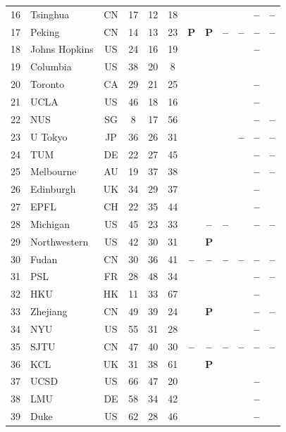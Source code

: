 \documentclass[pdflatex,sn-basic,Numbered]{sn-jnl}
\newcommand{\si}{\ding{51}}
\newcommand{\no}{\textcolor{gris}{\textbf{--}}}
\newcommand{\pc}{\textbf{P}}
\theoremstyle{thmstyleone}
\theoremstyle{thmstyletwo}
\theoremstyle{thmstylethree}
\begin{document}
\begin{appendices}
\begin{longtable}{@{}r l c c c c c c c c c c@{}}
	16 & Tsinghua & CN & 17 & 12 & 18 & \si & \si & \si & \si & \no & \no \\
	17 & Peking & CN & 14 & 13 & 23 & \pc & \pc & \no & \no & \no & \no \\
	18 & Johns Hopkins & US & 24 & 16 & 19 & \si & \si & \si & \si & \no & \si \\
	19 & Columbia & US & 38 & 20 & 8 & \si & \si & \si & \si & \si & \si \\
	20 & Toronto & CA & 29 & 21 & 25 & \si & \si & \si & \si & \no & \si \\
	21 & UCLA & US & 46 & 18 & 16 & \si & \si & \si & \si & \no & \si \\
	22 & NUS & SG & 8 & 17 & 56 & \si & \si & \si & \si & \no & \no \\
	23 & U Tokyo & JP & 36 & 26 & 31 & \si & \si & \si & \no & \no & \no \\
	24 & TUM & DE & 22 & 27 & 45 & \si & \si & \si & \si & \no & \no \\
	25 & Melbourne & AU & 19 & 37 & 38 & \si & \si & \si & \si & \no & \no \\
	26 & Edinburgh & UK & 34 & 29 & 37 & \si & \si & \si & \si & \no & \si \\
	27 & EPFL & CH & 22 & 35 & 44 & \si & \si & \si & \si & \no & \si \\
	28 & Michigan & US & 45 & 23 & 33 & \si & \no & \no & \si & \no & \no \\
	29 & Northwestern & US & 42 & 30 & 31 & \si & \pc & \si & \si & \si & \si \\
	30 & Fudan & CN & 30 & 36 & 41 & \no & \no & \no & \no & \no & \no \\
	31 & PSL & FR & 28 & 48 & 34 & \si & \si & \si & \si & \no & \no \\
	32 & HKU & HK & 11 & 33 & 67 & \si & \si & \si & \si & \no & \si \\
	33 & Zhejiang & CN & 49 & 39 & 24 & \si & \pc & \si & \si & \no & \no \\
	34 & NYU & US & 55 & 31 & 28 & \si & \si & \si & \si & \no & \si \\
	35 & SJTU & CN & 47 & 40 & 30 & \no & \no & \no & \no & \no & \no \\
	36 & KCL & UK & 31 & 38 & 61 & \si & \pc & \si & \si & \si & \si \\
	37 & UCSD & US & 66 & 47 & 20 & \si & \si & \si & \si & \no & \si \\
	38 & LMU & DE & 58 & 34 & 42 & \si & \si & \si & \si & \no & \si \\
	39 & Duke & US & 62 & 28 & 46 & \si & \si & \si & \si & \no & \si \\

\end{longtable}
\end{appendices}
\end{document}
